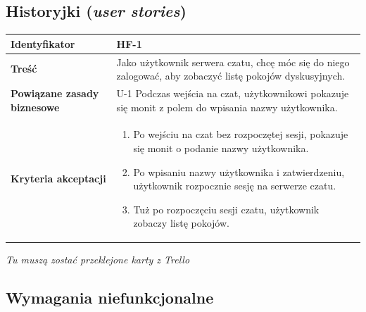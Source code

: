 \documentclass[11pt,oneside,a4paper,titlepage,onecolumn]{article}
\begin{document}
\subsection{Historyjki (\textit{user stories})}

\begin{tabular}{ | l | l | }
	\hline
		\textbf{Identyfikator} & 
		HF-1
		\\
		
	\hline
		\textbf{Treść} & \parbox[t]{13cm}{
			Jako użytkownik serwera czatu, chcę móc się do niego zalogować, aby zobaczyć listę pokojów dyskusyjnych.
		}\\
		 
	\hline
		\parbox[t]{4cm}{\textbf{Powiązane zasady biznesowe}} & \parbox[t]{13cm}{
			U-1 Podczas wejścia na czat, użytkownikowi pokazuje się monit z polem do wpisania nazwy użytkownika.
		}\\
		
	\hline
		\parbox[t]{4cm}{\textbf{Kryteria akceptacji}} & \parbox[t]{13cm}{
			\begin{enumerate}
				\item Po wejściu na czat bez rozpoczętej sesji, pokazuje się monit o podanie nazwy użytkownika.
				\item Po wpisaniu nazwy użytkownika i zatwierdzeniu, użytkownik rozpocznie sesję na serwerze czatu.
				\item Tuż po rozpoczęciu sesji czatu, użytkownik zobaczy listę pokojów.
			\end{enumerate}
			}
		\\

	\hline
\end{tabular}

\textit{Tu muszą zostać przeklejone karty z Trello}

\subsection{Wymagania niefunkcjonalne}
\end{document}
